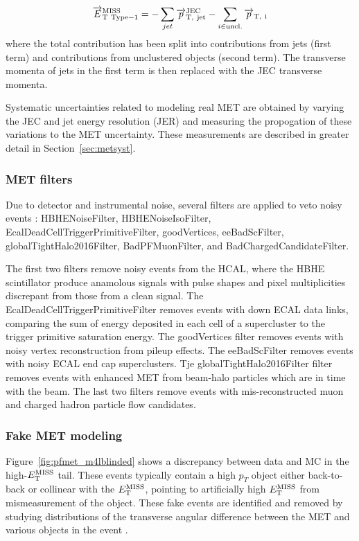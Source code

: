 \begin{equation}
\label{eq:t1met}
\overrightarrow{E}_{\rm{T\ Type-1}}^{\rm{MISS}} = - \sum_{jet} \overrightarrow{p}_{\rm{T},\ jet}^{\rm{JEC}} - \sum_{i \in \rm{uncl.}} \overrightarrow{p}_{\rm{T},\ i}
\end{equation}
where the total contribution has been split into contributions from jets (first term) and contributions from unclustered objects (second term). The transverse momenta of jets in the first term is then replaced with the JEC transverse momenta.

Systematic uncertainties related to modeling real MET are obtained by varying the JEC and jet energy resolution (JER) and measuring the propogation of these variations to the MET uncertainty. These measurements are described in greater detail in Section~\ref{sec:metsyst}.

\subsubsection{MET filters}

Due to detector and instrumental noise, several filters are applied to veto noisy events \cite{mettwiki}:
HBHENoiseFilter,
HBHENoiseIsoFilter,
EcalDeadCellTriggerPrimitiveFilter, 
goodVertices, 
eeBadScFilter, 
globalTightHalo2016Filter, 
BadPFMuonFilter, and
BadChargedCandidateFilter.

The first two filters remove noisy events from the HCAL, where the HBHE scintillator produce anamolous signals with pulse shapes and pixel multiplicities discrepant from those from a clean signal. The EcalDeadCellTriggerPrimitiveFilter removes events with down ECAL data links, comparing the sum of energy deposited in each cell of a supercluster to the trigger primitive saturation energy. The goodVertices filter removes events with noisy vertex reconstruction from pileup effects. The eeBadScFilter removes events with noisy ECAL end cap superclusters. Tje globalTightHalo2016Filter filter removes events with enhanced MET from beam-halo particles which are in time with the beam. The last two filters remove events with mis-reconstructed muon and charged hadron particle flow candidates.

\subsubsection{Fake MET modeling}\label{sec:fakemet}

Figure~\ref{fig:pfmet_m4lblinded} shows a discrepancy between data and MC in the high-$E_{\rm{T}}^{\rm{MISS}}$ tail. These events typically contain a high $p_T$ object either back-to-back or collinear with the $E_{\rm{T}}^{\rm{MISS}}$, pointing to artificially high $E_{\rm{T}}^{\rm{MISS}}$ from mismeasurement of the object. These fake events are identified and removed by studying distributions of the transverse angular difference between the MET and various objects in the event \cite{CMS-AN-15-203}.

